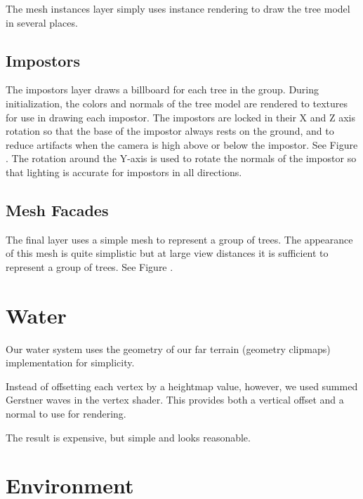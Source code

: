 The mesh instances layer simply uses instance rendering to draw the tree model in several places.

\subsection{Impostors}

The impostors layer draws a billboard for each tree in the group.
During initialization, the colors and normals of the tree model are rendered to textures for use in drawing each impostor.
The impostors are locked in their X and Z axis rotation so that the base of the impostor always rests on the ground, and to reduce artifacts when the camera is high above or below the impostor.
See Figure .
The rotation around the Y-axis is used to rotate the normals of the impostor so that lighting is accurate for impostors in all directions.

\subsection{Mesh Facades}

The final layer uses a simple mesh to represent a group of trees.
The appearance of this mesh is quite simplistic but at large view distances it is sufficient to represent a group of trees.
See Figure .

\section{Water} \label{sec:water} %


Our water system uses the geometry of our far terrain (geometry clipmaps) implementation for simplicity.

Instead of offsetting each vertex by a heightmap value, however, we used summed Gerstner waves in the vertex shader.
This provides both a vertical offset and a normal to use for rendering.

The result is expensive, but simple and looks reasonable.


\section{Environment} \label{sec:env} %

